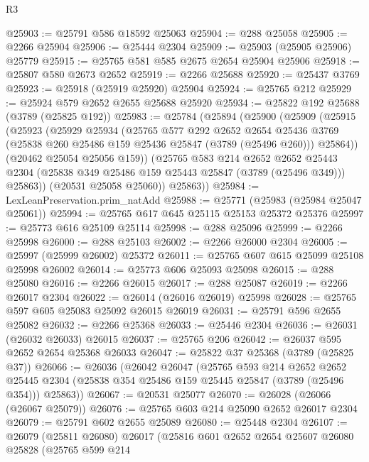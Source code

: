 \begin{lexlean}{R3}
\begin{coremodule}
@25903 := @25791 @586 @18592 @25063
@25904 := @288 @25058
@25905 := @2266 @25904
@25906 := @25444 @2304
@25909 := @25903 (@25905 @25906) @25779
@25915 := @25765 @581 @585 @2675 @2654 @25904 @25906
@25918 := @25807 @580 @2673 @2652
@25919 := @2266 @25688
@25920 := @25437 @3769
@25923 := @25918 (@25919 @25920) @25904
@25924 := @25765 @212
@25929 := @25924 @579 @2652 @2655 @25688 @25920
@25934 := @25822 @192 @25688 (@3789 (@25825 @192))
@25983 := @25784
    (@25894
      (@25900
        (@25909
          (@25915
            (@25923
              (@25929
                @25934
                (@25765
                  @577
                  @292
                  @2652
                  @2654
                  @25436
                  @3769
                  (@25838 @260 @25486 @159 @25436 @25847 (@3789 (@25496 @260)))
                  @25864))
              (@20462 @25054 @25056 @159))
            (@25765
              @583
              @214
              @2652
              @2652
              @25443
              @2304
              (@25838 @349 @25486 @159 @25443 @25847 (@3789 (@25496 @349)))
              @25863))
          (@20531 @25058 @25060))
        @25863))
@25984 := LexLeanPreservation.prim_natAdd
@25988 := @25771 (@25983 (@25984 @25047 @25061))
@25994 := @25765 @617 @645 @25115 @25153 @25372 @25376
@25997 := @25773 @616 @25109 @25114
@25998 := @288 @25096
@25999 := @2266 @25998
@26000 := @288 @25103
@26002 := @2266 @26000 @2304
@26005 := @25997 (@25999 @26002) @25372
@26011 := @25765 @607 @615 @25099 @25108 @25998 @26002
@26014 := @25773 @606 @25093 @25098
@26015 := @288 @25080
@26016 := @2266 @26015
@26017 := @288 @25087
@26019 := @2266 @26017 @2304
@26022 := @26014 (@26016 @26019) @25998
@26028 := @25765 @597 @605 @25083 @25092 @26015 @26019
@26031 := @25791 @596 @2655 @25082
@26032 := @2266 @25368
@26033 := @25446 @2304
@26036 := @26031 (@26032 @26033) @26015
@26037 := @25765 @206
@26042 := @26037 @595 @2652 @2654 @25368 @26033
@26047 := @25822 @37 @25368 (@3789 (@25825 @37))
@26066 := @26036
    (@26042
      @26047
      (@25765
        @593
        @214
        @2652
        @2652
        @25445
        @2304
        (@25838 @354 @25486 @159 @25445 @25847 (@3789 (@25496 @354)))
        @25863))
@26067 := @20531 @25077
@26070 := @26028 (@26066 (@26067 @25079))
@26076 := @25765 @603 @214 @25090 @2652 @26017 @2304
@26079 := @25791 @602 @2655 @25089
@26080 := @25448 @2304
@26107 := @26079
    (@25811 @26080)
    @26017
    (@25816
      @601
      @2652
      @2654
      @25607
      @26080
      @25828
      (@25765
        @599
        @214

\end{coremodule}
\end{lexlean}
